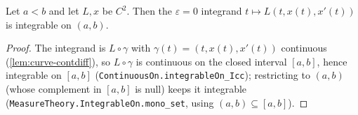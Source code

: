 \begin{lemma}
    \label{lem:base-integrand-integrable}
    \leanok
    Let $a < b$ and let $L, x$ be $C^2$. Then the $\varepsilon = 0$ integrand
    $t \mapsto L(t, x(t), x'(t))$ is integrable on $(a,b)$.
\end{lemma}
\begin{proof}
    The integrand is $L \circ \gamma$ with $\gamma(t) = (t,x(t),x'(t))$ continuous
    (\cref{lem:curve-contdiff}), so $L\circ\gamma$ is continuous on the closed
    interval $[a,b]$, hence integrable on $[a,b]$
    (\texttt{ContinuousOn.integrableOn\_Icc}); restricting to $(a,b)$ (whose
    complement in $[a,b]$ is null) keeps it integrable
    (\texttt{MeasureTheory.IntegrableOn.mono\_set}, using $(a,b)\subseteq[a,b]$).
\end{proof}

